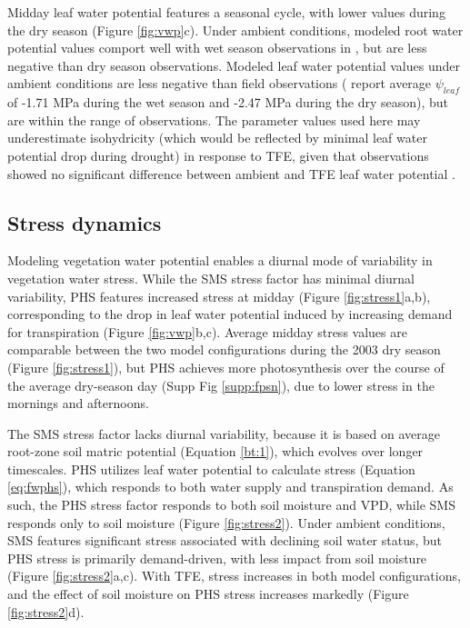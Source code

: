 \documentclass[draft,linenumbers]{agujournal}
\begin{document}
    Midday leaf water potential features a seasonal cycle, with lower values during the dry season (Figure \ref{fig:vwp}c).
    Under ambient conditions, modeled root water potential values comport well with wet season observations in \cite{fisher2006}, but are less negative than dry season observations.
    Modeled leaf water potential values under ambient conditions are less negative than field observations (\cite{fisher2006} report average $\psi_{leaf}$ of -1.71 MPa during the wet season and -2.47 MPa during the dry season), 
    but are within the range of observations.
    The parameter values used here may underestimate isohydricity (which would be reflected by minimal leaf water potential drop during drought) in response to TFE, given that observations showed no significant difference between ambient and TFE leaf water potential \citep{fisher2006}. 

\subsection{Stress dynamics}
    
    Modeling vegetation water potential enables a diurnal mode of variability in vegetation water stress.
    While the SMS stress factor has minimal diurnal variability,
    PHS features increased stress at midday (Figure \ref{fig:stress1}a,b), corresponding to the drop in leaf water potential induced by increasing demand for transpiration (Figure \ref{fig:vwp}b,c).
    Average midday stress values are comparable between the two model configurations during the 2003 dry season (Figure \ref{fig:stress1}), 
    but PHS achieves more photosynthesis over the course of the average dry-season day (Supp Fig \ref{supp:fpsn}), due to lower stress in the mornings and afternoons.
    
    The SMS stress factor lacks diurnal variability, because it is based on average root-zone soil matric potential (Equation \ref{bt:1}), which evolves over longer timescales.
    PHS utilizes leaf water potential to calculate stress (Equation \ref{eq:fwphs}), which responds to both water supply and transpiration demand.
    As such, the PHS stress factor responds to both soil moisture and VPD, while SMS responds only to soil moisture (Figure \ref{fig:stress2}).
    Under ambient conditions, SMS features significant stress associated with declining soil water status, but PHS stress is primarily demand-driven, with less impact from soil moisture (Figure \ref{fig:stress2}a,c).
    With TFE, stress increases in both model configurations, and the effect of soil moisture on PHS stress increases markedly (Figure \ref{fig:stress2}d).
\end{document}
